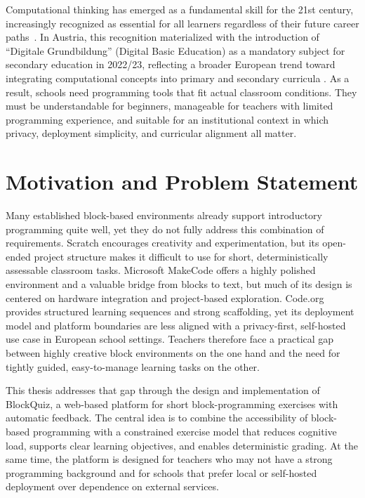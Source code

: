 Computational thinking has emerged as a fundamental skill for the 21st century,
increasingly recognized as essential for all learners regardless of their future career paths~\cite{wing2006, grover2013}.
In Austria, this recognition materialized with the introduction of ``Digitale Grundbildung'' (Digital Basic Education)
as a mandatory subject for secondary education in 2022/23, reflecting a broader European trend
toward integrating computational concepts into primary and secondary curricula \cite{digitale_grundbildung}.
As a result, schools need programming tools that fit actual classroom conditions. They must be understandable for beginners,
manageable for teachers with limited programming experience, and suitable for an institutional context in which privacy, deployment 
simplicity, and curricular alignment all matter.


\section{Motivation and Problem Statement}
Many established block-based environments already support introductory programming quite well, yet they do not fully address this combination of requirements.
Scratch \cite{resnick2009} encourages creativity and experimentation, but its open-ended project structure makes it difficult to use for short, deterministically assessable classroom tasks.
Microsoft MakeCode \cite{ball2019} offers a highly polished environment and a valuable bridge from blocks to text, but much of its design is centered on hardware integration and project-based exploration.
Code.org \cite{codeorg2026} provides structured learning sequences and strong scaffolding, yet its deployment model and platform boundaries are less aligned with a privacy-first, self-hosted use case
in European school settings.
Teachers therefore face a practical gap between highly creative block environments on the one hand and the need for tightly guided, easy-to-manage learning tasks on the other.

This thesis addresses that gap through the design and implementation of BlockQuiz, a web-based platform for short block-programming exercises with automatic feedback. The central idea
is to combine the accessibility of block-based programming with a constrained exercise model that reduces cognitive load, supports clear learning objectives, and enables deterministic grading.
At the same time, the platform is designed for teachers who may not have a strong programming background and for schools that prefer local or self-hosted deployment over dependence on external services.


